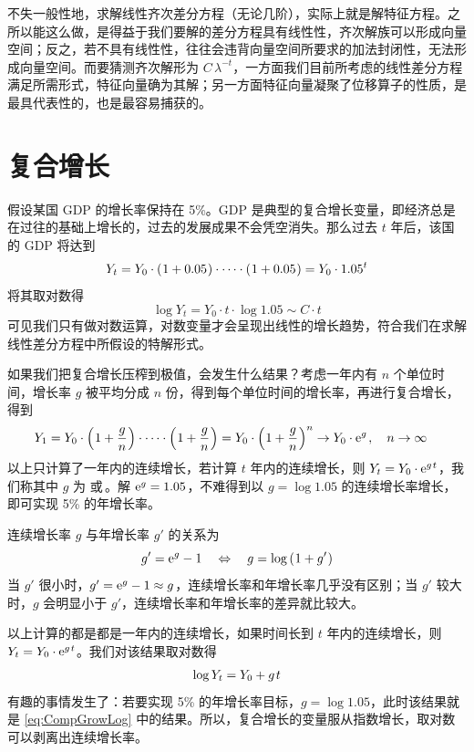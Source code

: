 不失一般性地，求解线性齐次差分方程（无论几阶），实际上就是解特征方程。之所以能这么做，是得益于我们要解的差分方程具有线性性，齐次解族可以形成向量空间；反之，若不具有线性性，往往会违背向量空间所要求的加法封闭性，无法形成向量空间。而要猜测齐次解形为 \(C\,\lambda^{-t}\)，一方面我们目前所考虑的线性差分方程满足所需形式，特征向量确为其解；另一方面特征向量凝聚了位移算子的性质，是最具代表性的，也是最容易捕获的。

\section{复合增长}\label{sec:CompGrow}

假设某国 GDP 的增长率保持在 5\%。GDP 是典型的复合增长变量，即经济总是在过往的基础上增长的，过去的发展成果不会凭空消失。那么过去 \(t\) 年后，该国的 GDP 将达到
\begin{equation}
    Y_t = Y_0 \cdot \left(\mspace{1mu}1+0.05\mspace{1mu}\right)\cdot  \cdots\cdot \left(\mspace{1mu}1+0.05\mspace{1mu}\right)=Y_0 \cdot 1.05^t\notag
\end{equation}
将其取对数得
\begin{equation}
    \log Y_t=Y_0 \cdot t\cdot\log 1.05\sim C\cdot t \label{eq:CompGrowLog}
\end{equation}
可见我们只有做对数运算，对数变量才会呈现出线性的增长趋势，符合我们在求解线性差分方程中所假设的特解形式。

如果我们把复合增长压榨到极值，会发生什么结果？考虑一年内有 \(n\) 个单位时间，增长率 \(g\) 被平均分成 \(n\) 份，得到每个单位时间的增长率，再进行复合增长，得到
\begin{align}
    Y_1 &= Y_0 \cdot \bka{1+\frac{g}{n}} \cdot \dots \cdot \bka{1+\frac{g}{n}}= Y_0 \cdot \bka{1+\frac{g}{n}}^n\to Y_0 \cdot \n e^{g}\,, \quad \nti\notag
\end{align}
以上只计算了一年内的连续增长，若计算 \(t\) 年内的连续增长，则 \(Y_t=Y_0 \cdot \n e^{g\,t}\)，我们称其中 \(g\) 为\,\,或\,。解 \(\text{e}^g=1.05\)，不难得到以 \(g=\log 1.05\) 的连续增长率增长，即可实现 5\% 的年增长率。

连续增长率 \(g\) 与年增长率 \(g'\) 的关系为
\begin{equation}
    g' = \text{e}^g - 1 \quad \Leftrightarrow \quad g = \operatorname{log}\left(\mspace{1mu}1+g'\mspace{1mu}\right)
\end{equation}
当 \(g'\) 很小时，\(g'=\text{e}^g-1\approx g\)，连续增长率和年增长率几乎没有区别；当 \(g'\) 较大时，\(g\) 会明显小于 \(g'\)，连续增长率和年增长率的差异就比较大。

以上计算的都是都是一年内的连续增长，如果时间长到 \(t\) 年内的连续增长，则 \(Y_t=Y_0 \cdot \n e^{g\,t}\)。我们对该结果取对数得
\begin{align}
    \log Y_t=Y_0 + g\,t \notag
\end{align}
有趣的事情发生了：若要实现 5\% 的年增长率目标，\(g=\log1.05\)，此时该结果就是 \ref{eq:CompGrowLog} 中的结果。所以，复合增长的变量服从指数增长，取对数可以剥离出连续增长率。


\SymmetricGeometry

